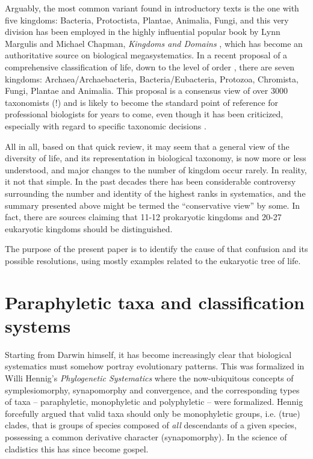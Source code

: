 \begin{artengenv}
Arguably, the most common variant found in introductory texts is the one with five kingdoms: Bacteria, Protoctista,
Plantae, Animalia, Fungi, and this very division has been employed in the highly influential popular book by Lynn
Margulis and Michael Chapman, \textit{Kingdoms and Domains}
\parencite{margulis_kingdoms_2009},
which has become an authoritative source on biological megasystematics. In a recent proposal of a comprehensive
classification of life, down to the level of order
\parencite{ruggiero_higher_2015},
there are seven
kingdoms: Archaea/Archaebacteria, Bacteria/Eubacteria, Protozoa, Chromista, Fungi, Plantae and Animalia. This proposal
is a consensus view of over 3000 taxonomists (!) and is likely to become the standard point of reference for
professional biologists for years to come, even though it has been criticized, especially with regard to specific
taxonomic decisions
\parencite[e.g.][]{tedersoo_high-level_2018}.

All in all, based on that quick review, it may seem that a general view of the diversity of life, and its representation
in biological taxonomy, is now more or less understood, and major changes to the number of kingdom occur rarely. In
reality, it not that simple. In the past decades there has been considerable controversy surrounding the number and
identity of the highest ranks in systematics, and the summary presented above might be termed the ``conservative view''
by some. In fact, there are sources claiming that 11-12 prokaryotic kingdoms
\parencite{petitjean_rooting_2014}
and 20-27 eukaryotic kingdoms
\parencite{pawlowski_new_2013,tedersoo_proposal_2017}
should be
distinguished.

The purpose of the present paper is to identify the cause of that confusion and its possible resolutions, using mostly
examples related to the eukaryotic tree of life.

\section{Paraphyletic taxa and classification systems}

Starting from Darwin himself, it has become increasingly clear that biological systematics must somehow portray
evolutionary patterns. This was formalized in Willi Hennig’s \textit{Phylogenetic Systematics}
\parencite{hennig_phylogenetic_1966}
where the now-ubiquitous concepts of symplesiomorphy, synapomorphy and
convergence, and the corresponding types of taxa -- paraphyletic, monophyletic and polyphyletic -- were formalized.
Hennig forcefully argued that valid taxa should only be monophyletic groups, i.e. (true) clades, that is groups of
species composed of \textit{all} descendants of a given species, possessing a common derivative character
(synapomorphy). In the science of cladistics this has since become gospel.


\end{artengenv}
